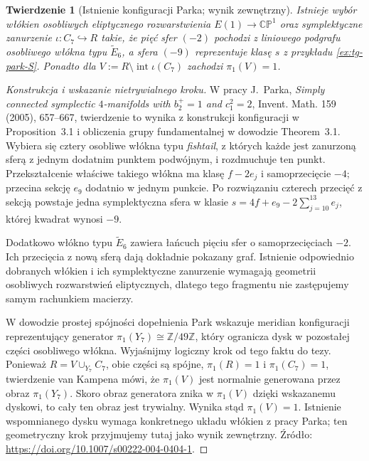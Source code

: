 \documentclass[11pt,a4paper]{report}
\numberwithin{equation}{section}
\theoremstyle{plain}
\newtheorem{twierdzenie}{Twierdzenie}[section]
\theoremstyle{definition}
\theoremstyle{remark}
\begin{document}
\begin{twierdzenie}[Istnienie konfiguracji Parka; wynik zewnętrzny]
\label{thm:tg-park-embedding}
Istnieje wybór włókien osobliwych eliptycznego rozwarstwienia
$E(1)\to\mathbb{CP}^{1}$ oraz symplektyczne zanurzenie
$\iota\colon C_7\hookrightarrow R$ takie, że pięć sfer
$(-2)$ pochodzi z liniowego podgrafu osobliwego włókna
typu $\widetilde E_6$, a sfera $(-9)$ reprezentuje klasę
$s$ z przykładu \ref{ex:tg-park-S}. Ponadto dla
$V:=R\setminus\operatorname{int}\iota(C_7)$ zachodzi
$\pi_1(V)=1$.
\end{twierdzenie}

\begin{proof}[Konstrukcja i wskazanie nietrywialnego kroku]
W pracy J.~Parka, \emph{Simply connected symplectic
$4$-manifolds with $b_2^+=1$ and $c_1^2=2$},
Invent. Math. 159 (2005), 657--667, twierdzenie to
wynika z konstrukcji konfiguracji w Proposition~3.1 i
obliczenia grupy fundamentalnej w dowodzie Theorem~3.1.
Wybiera się cztery osobliwe włókna typu \emph{fishtail},
z których każde jest zanurzoną sferą z jednym dodatnim
punktem podwójnym, i rozdmuchuje ten punkt. Przekształcenie
właściwe takiego włókna ma klasę $f-2e_j$ i
samoprzecięcie $-4$; przecina sekcję $e_9$ dodatnio
w jednym punkcie. Po rozwiązaniu czterech przecięć z sekcją
powstaje jedna symplektyczna sfera w klasie
$s=4f+e_9-2\sum_{j=10}^{13}e_j$, której kwadrat
wynosi $-9$.

Dodatkowo włókno typu $\widetilde E_6$ zawiera łańcuch
pięciu sfer o samoprzecięciach $-2$. Ich przecięcia
z nową sferą dają dokładnie pokazany graf. Istnienie
odpowiednio dobranych włókien i ich symplektyczne
zanurzenie wymagają geometrii osobliwych rozwarstwień
eliptycznych, dlatego tego fragmentu nie zastępujemy
samym rachunkiem macierzy.

W dowodzie prostej spójności dopełnienia Park wskazuje
meridian konfiguracji reprezentujący generator
$\pi_1(Y_7)\cong\mathbb Z/49\mathbb Z$, który ogranicza
dysk w pozostałej części osobliwego włókna.
Wyjaśnijmy logiczny krok od tego faktu do tezy.
Ponieważ $R=V\cup_{Y_7} C_7$, obie części są spójne,
$\pi_1(R)=1$ i $\pi_1(C_7)=1$, twierdzenie van Kampena
mówi, że $\pi_1(V)$ jest normalnie generowana przez
obraz $\pi_1(Y_7)$. Skoro obraz generatora znika w
$\pi_1(V)$ dzięki wskazanemu dyskowi, to cały ten obraz
jest trywialny. Wynika stąd $\pi_1(V)=1$.
Istnienie wspomnianego dysku wymaga konkretnego układu
włókien z pracy Parka; ten geometryczny krok przyjmujemy
tutaj jako wynik zewnętrzny. Źródło: \url{https://doi.org/10.1007/s00222-004-0404-1}.
\end{proof}
\end{document}
